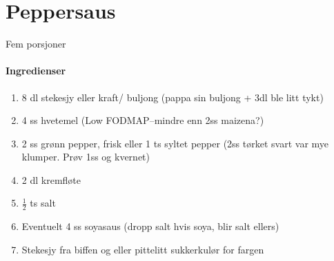 \section{﻿Peppersaus}
\label{peppersaus}
Fem porsjoner

\paragraph{Ingredienser}
\begin{enumerate}[noitemsep]
	\item 8 dl stekesjy eller kraft/ buljong (pappa sin buljong + 3dl ble litt tykt)
	\item 4 ss hvetemel (Low FODMAP--mindre enn 2ss maizena?)
	\item 2 ss grønn pepper, frisk eller 1 ts syltet pepper (2ss tørket svart var mye klumper.  Prøv 1ss og kvernet)
	\item 2 dl kremfløte
	\item  $\frac{1}{2}$  ts salt
	\item Eventuelt 4 ss soyasaus (dropp salt hvis soya, blir salt ellers)
	\item Stekesjy fra biffen og eller pittelitt sukkerkulør for fargen
\end{enumerate}
